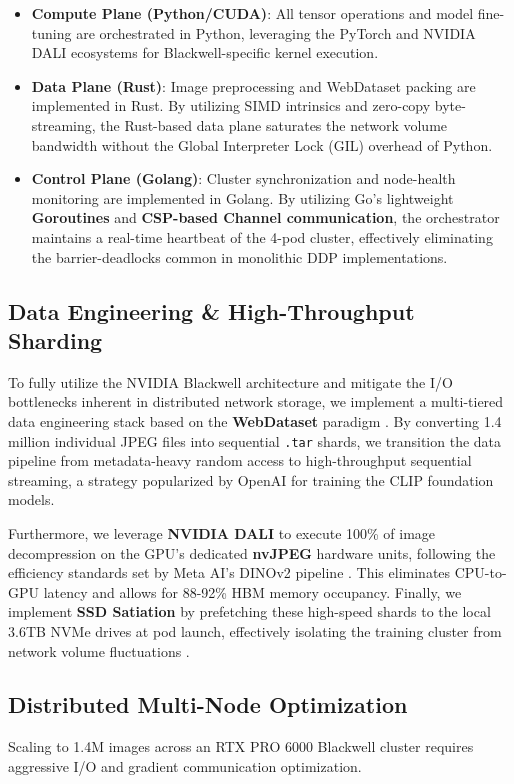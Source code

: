 \documentclass[10pt,twocolumn,letterpaper]{article}
\begin{document}
\begin{itemize}
    \item \textbf{Compute Plane (Python/CUDA)}: All tensor operations and model fine-tuning are orchestrated in Python, leveraging the PyTorch and NVIDIA DALI ecosystems for Blackwell-specific kernel execution.
    \item \textbf{Data Plane (Rust)}: Image preprocessing and WebDataset packing are implemented in Rust. By utilizing SIMD intrinsics and zero-copy byte-streaming, the Rust-based data plane saturates the network volume bandwidth without the Global Interpreter Lock (GIL) overhead of Python.
    \item \textbf{Control Plane (Golang)}: Cluster synchronization and node-health monitoring are implemented in Golang. By utilizing Go’s lightweight \textbf{Goroutines} and \textbf{CSP-based Channel communication}, the orchestrator maintains a real-time heartbeat of the 4-pod cluster, effectively eliminating the barrier-deadlocks common in monolithic DDP implementations.
\end{itemize}

\subsection{Data Engineering \& High-Throughput Sharding}
To fully utilize the NVIDIA Blackwell architecture and mitigate the I/O bottlenecks inherent in distributed network storage, we implement a multi-tiered data engineering stack based on the \textbf{WebDataset} paradigm \cite{webdataset}.
 By converting 1.4 million individual JPEG files into sequential \texttt{.tar} shards, we transition the data pipeline from metadata-heavy random access to high-throughput sequential streaming, a strategy popularized by OpenAI for training the CLIP \cite{radford2021clip} foundation models.

Furthermore, we leverage \textbf{NVIDIA DALI} \cite{dali} to execute 100\% of image decompression on the GPU's dedicated \textbf{nvJPEG} hardware units, following the efficiency standards set by Meta AI's DINOv2 pipeline \cite{oquab2023dinov2}. This eliminates CPU-to-GPU latency and allows for 88-92\% HBM memory occupancy. Finally, we implement \textbf{SSD Satiation} by prefetching these high-speed shards to the local 3.6TB NVMe drives at pod launch, effectively isolating the training cluster from network volume fluctuations \cite{mohan2021bottlenecks}.

\subsection{Distributed Multi-Node Optimization}
Scaling to 1.4M images across an RTX PRO 6000 Blackwell cluster requires aggressive I/O and gradient communication optimization.
\end{document}
